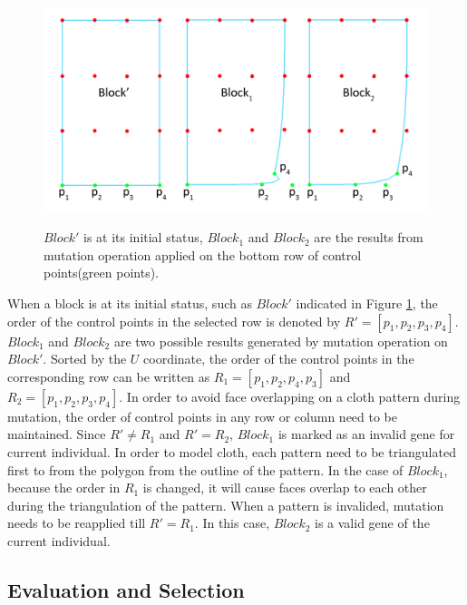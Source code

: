 \begin{figure}[H]
	\centering
	\includegraphics[width=1.0\columnwidth]{../images/mutation_evaluation}\\[0.1cm]
    \caption[Block mutation validation]{$Block'$ is at its initial status, $Block_{1}$ and $Block_{2}$ are the results from mutation operation applied on the bottom row of control points(green points).}
    \label{figure:mutation_evaluation}
\end{figure}

When a block is at its initial status, such as $Block'$ indicated in Figure \ref{figure:mutation_evaluation}, the order of the control points in the selected row is denoted by $R' = [p_{1}, p_{2}, p_{3}, p_{4}]$. $Block_{1}$ and $Block_{2}$ are two possible results generated by mutation operation on $Block'$. Sorted by the $U$ coordinate, the order of the control points in the corresponding row can be written as $R_{1} = [p_{1}, p_{2}, p_{4}, p_{3}]$ and $R_{2} = [p_{1}, p_{2}, p_{3}, p_{4}]$. In order to avoid face overlapping on a cloth pattern during mutation, the order of control points in any row or column need to be maintained. Since $R' \neq R_{1}$ and $R' = R_{2}$, $Block_{1}$ is marked as an invalid gene for current individual. In order to model cloth, each pattern need to be triangulated first to from the polygon from the outline of the pattern. In the case of $Block_{1}$, because the order in $R_{1}$ is changed, it will cause faces overlap to each other during the triangulation of the pattern.  When a pattern is invalided, mutation needs to be reapplied till $R' = R_{1}$. In this case, $Block_{2}$ is a valid gene of the current individual. 

\subsection{Evaluation and Selection}

